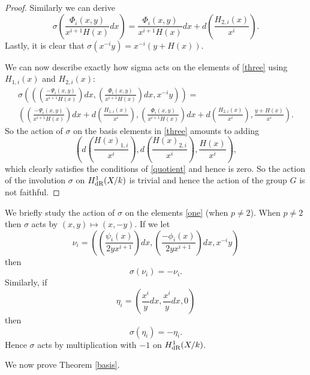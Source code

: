 \begin{proof}
    Similarly we can derive
        \begin{equation*}
        \sigma \left( \frac{\Phi_i(x,y)}{x^{i+1}H(x)} dx \right)  = \frac{\Phi_i(x,y)}{x^{i+1}H(x)} dx + d \left( \frac{H_{2,i}(x)}{x^i} \right).
        \end{equation*}
    Lastly, it is clear that $\sigma(x^{-i}y) = x^{-i}(y+H(x))$.
    
    
    We can now describe exactly how sigma acts on the elements of \eqref{three} using $H_{1,i}(x)$ and $H_{2,i}(x)$:
        \begin{multline*}
        \sigma \left( \left( \left(\frac{-\Psi_i(x,y)}{x^{i+1}H(x)}\right) dx, \left( \frac{\Phi_i(x,y)}{x^{i+1}H(x)} \right) dx, x^{-i}y \right)\right) = \\
         \left( \left(\frac{-\Psi_i(x,y)}{x^{i+1}H(x)} \right) dx + d\left(\frac{H_{1,i}(x)}{x^i}\right),  \left( \frac{\Phi_i(x,y)}{x^{i+1}H(x)} \right) dx+ d\left(\frac{H_{2,i}(x)}{x^i} \right), \frac{y+H(x)}{x^i} \right).
        \end{multline*}
    So the action of $\sigma$ on the basis elements in \eqref{three} amounts to adding 
        \[
        \left( d\left(\frac{H(x)_{1,i}}{x^i}\right), d\left(\frac{H(x)_{2,i}}{x^i}\right), \frac{H(x)}{x^i} \right),
        \]
    which clearly satisfies the conditions of \eqref{quotient} and hence is zero.
    So the action of the involution $\sigma$ on $H_{\text {dR}}^1(X/k)$ is trivial and hence the action of the group $G$ is not faithful.
    \end{proof}

    \begin{rem}
    We briefly study the action of $\sigma$ on the elements \eqref{one} (when $p\neq 2$).
    When $p \neq 2$ then $\sigma$ acts by $(x,y) \mapsto (x,-y)$.
    If we let
        \[
        \nu_i = \left( \left( \frac{\psi_i(x)}{2yx^{i+1}}\right) dx, \left(\frac{-\phi_i(x)}{2yx^{i+1}}\right) dx, x^{-i}y\right)
        \]
    then 
        \begin{equation*}
        \sigma(\nu_i) = -\nu_i.
        \end{equation*}
    Similarly, if 
        \[
        \eta_i = \left( \frac{x^i}{y}dx, \frac{x^i}{y}dx, 0 \right)
        \]
    then 
        \[
        \sigma(\eta_i) = - \eta_i.
        \]
    Hence $\sigma$ acts by multiplication with $-1$ on $H_{\text {dR}}^1(X/k)$.
    \end{rem}


We now prove Theorem \ref{basis}.

